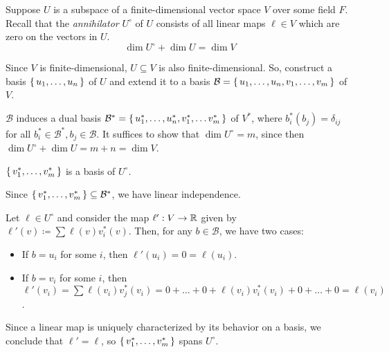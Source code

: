 \documentclass{article}
\begin{document}
\begin{problem}
Suppose $U$ is a subspace of a finite-dimensional vector space $V$ over some field $F$.
Recall that the \emph{annihilator} $U^\circ$ of $U$ consists of all linear maps $\ell \in V$ which are zero on the vectors in $U$.
\[
	\dim U^\circ + \dim U = \dim V
\]
\end{problem}
\begin{solution}
	Since $V$ is finite-dimensional, $U \subseteq V$ is also finite-dimensional.
	So, construct a basis $\set{u_1, \dots, u_n}$ of $U$ and extend it to a basis $\mathcal{B} = \set{u_1, \dots, u_n, v_1, \dots, v_m}$ of $V$.

	$\mathcal{B}$ induces a dual basis $\mathcal{B}^* = \set{u_1^*, \dots, u_n^*, v_1^*, \dots v_m^*}$ of $V^*$, where $b_i^*(b_j) = \delta_{ij}$ for all $b_i^* \in \mathcal{B}^*, b_j \in \mathcal{B}$.
	It suffices to show that $\dim U^\circ = m$, since then $\dim U^\circ + \dim U = m + n = \dim V$.

	\begin{claim*}
		$\set{v_1^*, \dots, v_m^*}$ is a basis of $U^\circ$.
	\end{claim*}
	Since $\set{v_1^*, \dots, v_m^*} \subseteq \mathcal{B}^*$, we have linear independence.

	Let $\ell \in U^\circ$ and consider the map $\ell' : V \to \mathbb{R}$ given by $\ell'(v) \coloneq \sum \ell(v) v_i^*(v)$.
	Then, for any $b \in \mathcal{B}$, we have two cases:
	\begin{itemize}
		\item If $b = u_i$ for some $i$, then $\ell'(u_i) = 0 = \ell(u_i)$.
		\item If $b = v_i$ for some $i$, then $\ell'(v_i) = \sum \ell(v_i) v_j^*(v_i) = 0 + \dots + 0 + \ell(v_i)v_i^*(v_i) + 0 + \dots + 0 = \ell(v_i)$.
	\end{itemize}
	Since a linear map is uniquely characterized by its behavior on a basis, we conclude that $\ell' = \ell$, so $\set{v_1^*, \dots, v_m^*}$ spans $U^\circ$.
\end{solution}
\end{document}
